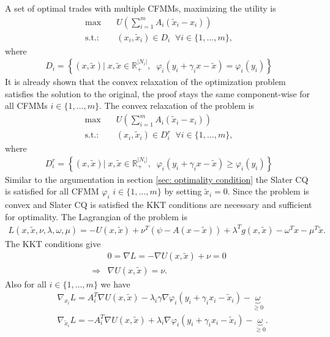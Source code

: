 A set of optimal trades with multiple CFMMs, maximizing the utility is
\begin{align}
    \text{max} \quad &U\left(\sum_{i=1}^{m} A_i(\tilde{x}_i-x_i)\right)\\
    \text{s.t.:}\quad
                      & (x_i, \tilde{x}_i) \in D_i \;\; \forall i \in
                      \{1,\ldots,m\},
\end{align}
where
\begin{align}
D_i = \left\{(x, \tilde{x})|\; x, \tilde{x} \in \mathbb{R}^{|N_i|}_+, \;\;
    \varphi_i(y_i+\gamma_ix - \tilde{x}) = \varphi_i(y_i)
\right\}
\end{align}
It is already shown that the convex relaxation of the optimization problem
satisfies the solution to the original, the proof stays the same
component-wise for all CFMMs $i \in \{1,\ldots,m\}$. The convex relaxation of
the problem is
\begin{align}
    \text{max} \quad &U\left(\sum_{i=1}^{m} A_i(\tilde{x}_i-x_i)\right) \label{eq: multi_dex_trade}\\
    \text{s.t.:}\quad & (x_i, \tilde{x}_i) \in D_i^{r}
          \;\; \forall i \in
          \{1,\ldots,m\},
\end{align}
where
\begin{align}
D_i^{r}  = \left\{(x, \tilde{x})|\; x, \tilde{x} \in \mathbb{R}^{|N_i|}_+, \;\;
    \varphi_i(y_i+\gamma_ix - \tilde{x}) \ge \varphi_i(y_i)
\right\}
\end{align}
Similar to the argumentation in section \ref{sec: optimality condition} the
Slater CQ is satisfied for all CFMM $\varphi_i$ $i \in \{1,\ldots,m\}$ by
setting $\tilde{x}_i = 0$. Since the problem is convex and Slater CQ is
satisfied the KKT conditions are necessary and sufficient for optimality. The
Lagrangian of the problem is
\begin{align}
    L(x, \tilde{x}, \nu, \lambda, \omega, \mu) = -U(x, \tilde{x}) +
    \nu^{T}\left(  \psi - A(x-\tilde{x})\right) + \lambda^{T} g(x, \tilde{x})
    -\omega^{T} x - \mu^{T} \tilde{x}.
\end{align}
The KKT conditions give
\begin{align}
    &0 = \nabla L = -\nabla U(x, \tilde{x}) + \nu = 0 \\
    \Rightarrow& \nabla U(x, \tilde{x}) = \nu.
\end{align}
Also for all $i \in \{1,\ldots,m\}$ we have
\begin{align}
    &\nabla_{x_i} L = A_i^{T}\nabla U(x, \tilde{x}) - \lambda_i\gamma\nabla\varphi_i(y_i
    +\gamma_ix_i -\tilde{x}_i) - \underbrace{\omega}_{\ge0}\\
    &\nabla_{\tilde{x}_i} L = -A_i^{T}\nabla U(x, \tilde{x}) + \lambda_i\nabla\varphi_i(y_i
    +\gamma_ix_i -\tilde{x}_i) - \underbrace{\omega}_{\ge0}.
\end{align}
